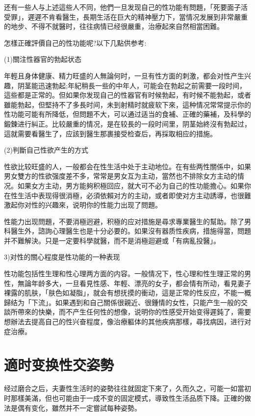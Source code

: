\documentclass[12pt,UTF8]{ctexbook}
\begin{document}
还有一些人与上述這些人不同，他們一旦发现自己的性功能有問題，「死要面子活受罪」，遲遲不肯看醫生，長期生活在巨大的精神壓力下，當情况发展到非常嚴重的地步、不得不就醫时，往往病情已经很嚴重，治療起來自然相當困難。

怎樣正確評價自己的性功能呢?以下几點供参考:

(1)關注性器官的勃起状态

年輕且身体健康、精力旺盛的人無論何时，一旦有性方面的刺激，都会对性产生兴趣，阴茎能迅速勃起;年紀稍長一些的中年人，可能会在勃起之前需要一段时间，這些都是正常的。但如果你发现自己的性器官有时候勃起，有时候不能勃起，或者雖能勃起，但堅持不了多長时间，未到射精时就疲软下來，這种情况常常提示你的性功能可能有所降低，但問題不大，可以通过适当的食補、正確的藥補，及科學的鍛鍊进行糾正。比较嚴重的情况，是在较長的一段时间里，阴茎始終沒有勃起过，這就需要看醫生了，应該到醫生那裹接受检查后，再採取相应的措施。

(2)判斷自己性欲产生的方式

性欲比较旺盛的人，一般都会在性生活中处于主动地位。在有些两性關係中，如果男女雙方的性欲强度差不多，常常是男女互为主动，當然也不排除女方主动的情况。如果女方主动，男方能夠积極回应，就大可不必为自己的性功能擔心。如果你在性生活中表现得很消極，必須依賴对方的主动，或者即使对方主动誘導，也很難激起你对性的兴趣來，说明你的性能力出现了問題。

性能力出现問題，不要消極迥避，积極的应对措施是尋求專業醫生的幫助。除了男科醫生外，諮詢心理醫生也是十分必要的。如果沒有器质性疾病，措施得當，問題并不難解決。只是一定要科學就醫，而不是消極迴避或「有病亂投醫」。

3)对性的關心程度是性功能的一种表现

性功能包括性生理和性心理两方面的内容。一般情况下，性心理和性生理正常的男性，無論年龄多大，一旦看見性感、年輕、漂亮的女子，都会情有所动，看見妻子裸露的肌肤，「肤色如凝脂」，就会有想抚摸的衝动，這是正常的性反应，不能一概歸结为「下流」。如果遇到和自己關係很親近、很鍾情的女性，只能产生一般的交談所帶來的快樂，而不产生任何性的想像，说明你的性感受开始变得遲鈍了，需要想辦法去提高自己的性兴奋程度，像治療軀体的其他疾病那樣，尋找病因，进行对症治療。

\section{適时变换性交姿勢}

经过磨合之后，夫妻性生活时的姿勢往往就固定下來了，久而久之，可能一如當初时那樣美滿，但也可能由于一成不变的固定模式，導致性生活品质下降。正確的做法是偶有变化，雖然并不一定嘗試每种姿勢。
\end{document}

